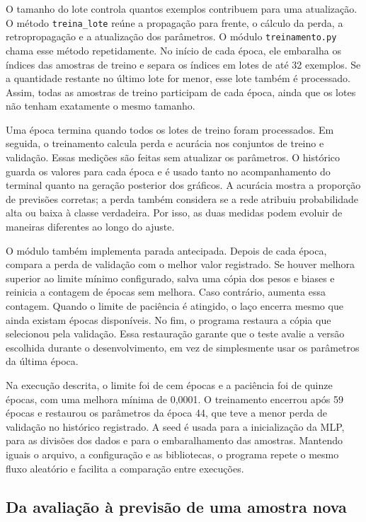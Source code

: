 \documentclass[12pt]{article}
\begin{document}
O tamanho do lote controla quantos exemplos contribuem para uma atualização. O método \texttt{treina\_lote} reúne a propagação para frente, o cálculo da perda, a retropropagação e a atualização dos parâmetros. O módulo \texttt{treinamento.py} chama esse método repetidamente. No início de cada época, ele embaralha os índices das amostras de treino e separa os índices em lotes de até 32 exemplos. Se a quantidade restante no último lote for menor, esse lote também é processado. Assim, todas as amostras de treino participam de cada época, ainda que os lotes não tenham exatamente o mesmo tamanho.

Uma época termina quando todos os lotes de treino foram processados. Em seguida, o treinamento calcula perda e acurácia nos conjuntos de treino e validação. Essas medições são feitas sem atualizar os parâmetros. O histórico guarda os valores para cada época e é usado tanto no acompanhamento do terminal quanto na geração posterior dos gráficos. A acurácia mostra a proporção de previsões corretas; a perda também considera se a rede atribuiu probabilidade alta ou baixa à classe verdadeira. Por isso, as duas medidas podem evoluir de maneiras diferentes ao longo do ajuste.

O módulo também implementa parada antecipada. Depois de cada época, compara a perda de validação com o melhor valor registrado. Se houver melhora superior ao limite mínimo configurado, salva uma cópia dos pesos e biases e reinicia a contagem de épocas sem melhora. Caso contrário, aumenta essa contagem. Quando o limite de paciência é atingido, o laço encerra mesmo que ainda existam épocas disponíveis. No fim, o programa restaura a cópia que selecionou pela validação. Essa restauração garante que o teste avalie a versão escolhida durante o desenvolvimento, em vez de simplesmente usar os parâmetros da última época.

Na execução descrita, o limite foi de cem épocas e a paciência foi de quinze épocas, com uma melhora mínima de 0,0001. O treinamento encerrou após 59 épocas e restaurou os parâmetros da época 44, que teve a menor perda de validação no histórico registrado. A seed é usada para a inicialização da MLP, para as divisões dos dados e para o embaralhamento das amostras. Mantendo iguais o arquivo, a configuração e as bibliotecas, o programa repete o mesmo fluxo aleatório e facilita a comparação entre execuções.

\subsection{Da avaliação à previsão de uma amostra nova}
\end{document}
